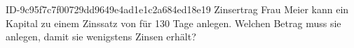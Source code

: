 \begin{exercise}
      {ID-9c95f7c7f00729dd9649e4ad1e1c2a684ed18e19}
      {Zinsertrag}
  \ifproblem\problem
    Frau Meier kann ein Kapital zu einem Zinssatz von  für \num{130}
    Tage anlegen. Welchen Betrag muss sie anlegen, damit sie wenigstens
     Zinsen erhält?
  \fi
\end{exercise}
